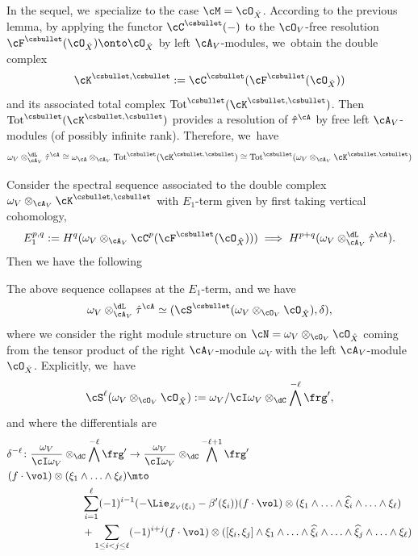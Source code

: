 In the sequel, we~specialize to the case $\cM=\cO_{\hat{X}}$.
According to the previous lemma, by applying the functor
$\cC^{\csbullet}(-)$ to the $\cO_V$-free resolution $\cF^{\csbullet}(\cO_{\hat{X}}) \onto \cO_{\hat{X}}$ by left $\cA_V$\nobreakdash-mod\-ules, we~obtain the double complex
\[
\cK^{\csbullet,\csbullet} :=
\cC^{\csbullet}(\cF^{\csbullet}(\cO_{\hat{X}}))
\]
and its associated total complex $\textup{Tot}^{\csbullet}(\cK^{\csbullet,\csbullet})$. Then
$\textup{Tot}^{\csbullet}(\cK^{\csbullet,\csbullet})$ provides a resolution of $\hat\tau^\cA$ by free left $\cA_V$\nobreakdash-mod\-ules (of possibly infinite rank). Therefore, we~have
\[
\omega_V\otimes^\dL_{\cA_V}\hat\tau^\cA\cong
\omega_\cA \otimes_{\cA_V} \textup{Tot}^{\csbullet}(\cK^{\csbullet,\csbullet})
\cong
\textup{Tot}^{\csbullet}(\omega_V \otimes_{\cA_V}\cK^{\csbullet,\csbullet})
\]

Consider the spectral sequence associated to the double complex $\omega_V \otimes_{\cA_V}\cK^{\csbullet,\csbullet}$
with $E_1$-term given by first taking vertical cohomology, \ie
\[
E_1^{p,q}:=H^q(\omega_V\otimes_{\cA_V}
\cC^p(\cF^{\csbullet}(\cO_{\hat{X}}))) \implies
H^{p+q}(\omega_V\otimes^\dL_{\cA_V}\hat\tau^\cA).
\]
Then we have the following

\begin{lem}
The above sequence collapses at the $E_1$-term, and we have
\[
\omega_V\otimes^\dL_{\cA_V}\hat\tau^\cA
\simeq (\cS^{\csbullet}(\omega_V\otimes_{\cO_V}\cO_{\hat{X}}), \delta),
\]
where we consider the right module structure on $\cN=\omega_V\otimes_{\cO_V}\cO_{\hat{X}}$ coming from the tensor product of the right $\cA_V$\nobreakdash-mod\-ule $\omega_V$ with the left $\cA_V$\nobreakdash-mod\-ule $\cO_{\hat{X}}$.
Explicitly, we~have
\[
\cS^\ell(\omega_V\otimes_{\cO_V}\cO_{\hat{X}}):=
\omega_V/\cI\omega_V\otimes_\dC \bigwedge^{-\ell}\frg',
\]
and where the differentials are
\begin{align*}
\delta^{-\ell} \colon
\frac{\omega_V}{\cI\omega_V}\otimes_\dC \bigwedge^{-\ell}\frg'
&\to
\frac{\omega_V}{\cI\omega_V}\otimes_\dC \bigwedge^{-\ell+1}\frg'
\\
(f\cdot\vol) \otimes (\xi_1 \wedge \ldots \wedge \xi_\ell) &\mto\\
&\hspace*{-1.5cm}
\sum\limits_{i=1}^\ell (-1)^{i-1}
(-\Lie_{Z_V(\xi_i)}-\beta'(\xi_i))(f\cdot\vol) \otimes (\xi_1 \wedge \ldots \wedge \widehat{\xi}_i \wedge\ldots \wedge \xi_\ell)\\
&\hspace*{-1.5cm}+ \sum\limits_{1 \leq i < j \leq \ell} (-1)^{i+j} (f\cdot\vol)\otimes ([\xi_i,\xi_j] \wedge \xi_1 \wedge \ldots \wedge \widehat{\xi}_i \wedge \ldots \wedge \widehat{\xi}_j \wedge \ldots \wedge \xi_\ell)
\end{align*}
\end{lem}

